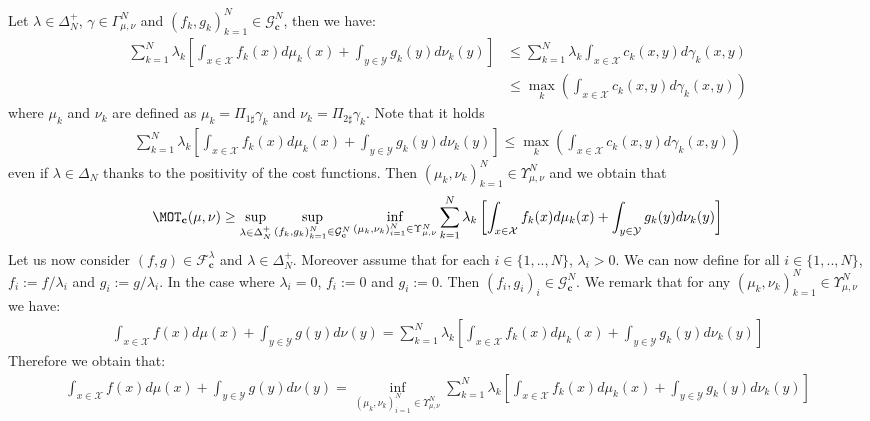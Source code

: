 \begin{prv*}
Let $\lambda\in\Delta_N^{+}$, $\gamma\in\Gamma_{\mu,\nu}^N$ and $(f_k,g_k)_{k=1}^N\in  \mathcal{G}^{N}_{\mathbf{c}}$, then we have:
\begin{align*}
    \sum_{k=1}^N \lambda_k \left[\int_{x\in\mathcal{X}} f_k(x)d\mu_k(x)+ \int_{y\in\mathcal{Y}} g_k(y)d\nu_k(y)\right] &\leq   \sum_{k=1}^N \lambda_k \int_{x\in\mathcal{X}} c_k(x,y)d\gamma_k(x,y)\\
    &\leq  \max_k \left(\int_{x\in\mathcal{X}} c_k(x,y)d\gamma_k(x,y)\right)
\end{align*}
where $\mu_k$ and $\nu_k$ are defined as $\mu_k=\Pi_{1\sharp}\gamma_k$ and $\nu_k=\Pi_{2\sharp}\gamma_k$. Note that it holds 
\begin{align*}
    \sum_{k=1}^N \lambda_k \left[\int_{x\in\mathcal{X}} f_k(x)d\mu_k(x)+ \int_{y\in\mathcal{Y}} g_k(y)d\nu_k(y)\right] \leq  \max_k \left(\int_{x\in\mathcal{X}} c_k(x,y)d\gamma_k(x,y)\right)
\end{align*}
even if $\lambda\in\Delta_N$ thanks to the positivity of the cost functions. Then $(\mu_k,\nu_k)_{k=1}^N\in \Upsilon_{\mu,\nu}^N$
and we obtain that 
\begin{align*}
  \MOT_{\mathbf{c}}(\mu,\nu) \geq \sup_{\lambda\in\Delta^+_N} \sup\limits_{(f_k,g_k)_{k=1}^N\in  \mathcal{G}^{N}_{\mathbf{c}}} \inf_{(\mu_k,\nu_k)_{i=1}^N\in\Upsilon_{\mu,\nu}^N } \sum_{k=1}^N \lambda_k \left[\int_{x\in\mathcal{X}} f_k(x)d\mu_k(x)+ \int_{y\in\mathcal{Y}} g_k(y)d\nu_k(y)\right]
\end{align*}
Let us now consider $(f,g)\in \mathcal{F}^{\lambda}_{\mathbf{c}}$ and $\lambda\in\Delta_N^{+}$. Moreover assume that for each $i\in\{1,..,N\}$, $\lambda_i>0$. We can now define for all $i\in\{1,..,N\}$, $f_i:= f/\lambda_i$ and $g_i:= g/\lambda_i$. In the case where $\lambda_i=0$, $f_i:=0$ and $g_i:=0$. Then $(f_i,g_i)_i\in \mathcal{G}^N_\mathbf{c}$. We remark that for any $(\mu_k,\nu_k)_{k=1}^N\in\Upsilon_{\mu,\nu}^N$ we have:
\begin{align*}
    \int_{x\in\mathcal{X}} f(x)d\mu(x)+ \int_{y\in\mathcal{Y}} g(y)d\nu(y) = \sum_{k=1}^N \lambda_k \left[\int_{x\in\mathcal{X}} f_k(x)d\mu_k(x)+ \int_{y\in\mathcal{Y}} g_k(y)d\nu_k(y)\right]
\end{align*}
Therefore we obtain that:
\begin{align*}
    \int_{x\in\mathcal{X}} f(x)d\mu(x)+ \int_{y\in\mathcal{Y}} g(y)d\nu(y) = \inf_{(\mu_k,\nu_k)_{i=1}^N\in\Upsilon_{\mu,\nu}^N } \sum_{k=1}^N \lambda_k \left[\int_{x\in\mathcal{X}} f_k(x)d\mu_k(x)+ \int_{y\in\mathcal{Y}} g_k(y)d\nu_k(y)\right]

\end{align*}
\end{prv*}
